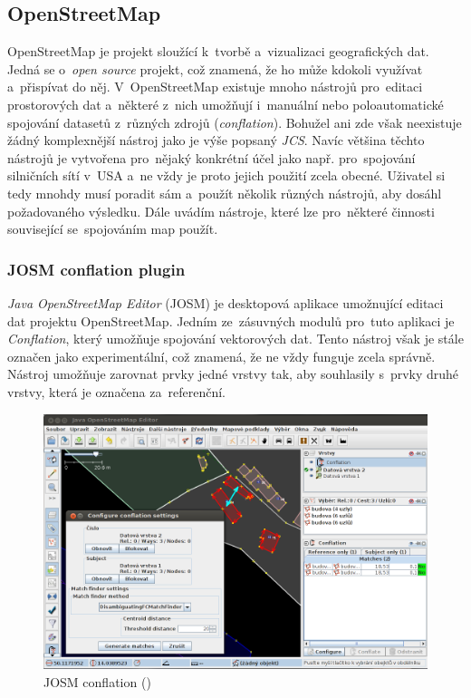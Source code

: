 
\subsection{OpenStreetMap}
\label{OSM}

OpenStreetMap je projekt sloužící k~tvorbě a~vizualizaci geografických dat.
Jedná se o~\textit{open source} projekt, což znamená, že ho může kdokoli 
využívat a~přispívat do něj. V~OpenStreetMap existuje mnoho nástrojů 
pro~editaci prostorových dat a~některé z~nich umožňují i~manuální nebo
poloautomatické spojování datasetů z~různých zdrojů (\textit{conflation}). 
Bohužel ani zde však neexistuje žádný komplexnější nástroj jako je výše
popsaný \textit{JCS}. Navíc většina těchto nástrojů je vytvořena pro~nějaký
konkrétní účel jako např. pro~spojování silničních sítí v~USA a~ne vždy
je proto jejich použití zcela obecné. Uživatel si tedy mnohdy musí poradit
sám a~použít několik různých nástrojů, aby dosáhl požadovaného výsledku.
Dále uvádím nástroje, které lze pro~některé činnosti související 
se~spojováním map použít. 

\subsubsection{JOSM conflation plugin}

\textit{Java OpenStreetMap Editor} (JOSM) je desktopová aplikace umožnující
editaci dat projektu OpenStreetMap. Jedním ze~zásuvných modulů pro~tuto 
aplikaci je \textit{Conflation}, který umožňuje spojování vektorových dat. 
Tento nástroj však je stále označen jako experimentální, což znamená, že ne 
vždy funguje zcela správně. Nástroj umožňuje zarovnat prvky jedné vrstvy tak,
aby souhlasily s~prvky druhé vrstvy, která je označena za~referenční. 

\label{josmpic}
  \begin{figure}[hbt]
    \centering
      \includegraphics[width=350pt]{./pictures/josm.png}
      \caption{JOSM conflation ()}
      \label{fig:josm}
  \end{figure} 

